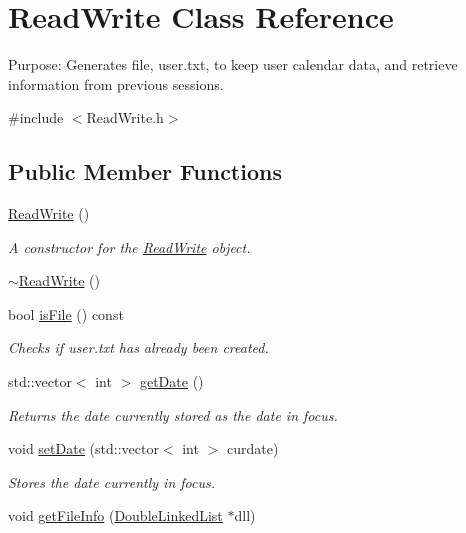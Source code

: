\hypertarget{class_read_write}{}\section{Read\+Write Class Reference}
\label{class_read_write}


Purpose\+: Generates file, user.\+txt, to keep user calendar data, and retrieve information from previous sessions.  




{\ttfamily \#include $<$Read\+Write.\+h$>$}

\subsection*{Public Member Functions}
\begin{DoxyCompactItemize}
\item 
\hyperlink{class_read_write_a11c22591e481ff4fc111e485ab2955c2}{Read\+Write} ()
\begin{DoxyCompactList}\small\item\em A constructor for the \hyperlink{class_read_write}{Read\+Write} object. \end{DoxyCompactList}\item 
\hyperlink{class_read_write_a3ba4e7d0b1aba13ab9b7a72898fa94a7}{$\sim$\+Read\+Write} ()
\item 
bool \hyperlink{class_read_write_af93a5b21f22c6db3d50361b5fd99c668}{is\+File} () const
\begin{DoxyCompactList}\small\item\em Checks if user.\+txt has already been created. \end{DoxyCompactList}\item 
std\+::vector$<$ int $>$ \hyperlink{class_read_write_af7557737b9043d9e605473c7e6984046}{get\+Date} ()
\begin{DoxyCompactList}\small\item\em Returns the date currently stored as the date in focus. \end{DoxyCompactList}\item 
void \hyperlink{class_read_write_a22a0b16f5004c059980424203c84978a}{set\+Date} (std\+::vector$<$ int $>$ curdate)
\begin{DoxyCompactList}\small\item\em Stores the date currently in focus. \end{DoxyCompactList}\item 
void \hyperlink{class_read_write_a778d106489a4f41730d902d338ec3937}{get\+File\+Info} (\hyperlink{class_double_linked_list}{Double\+Linked\+List} $\ast$dll)

\end{DoxyCompactItemize}
